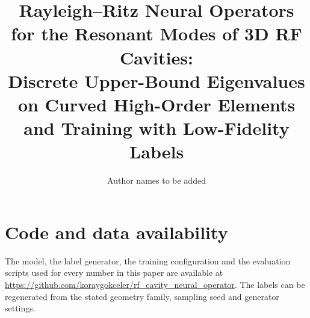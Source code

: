 \documentclass[11pt]{article}
\title{Rayleigh--Ritz Neural Operators for the Resonant Modes of 3D RF Cavities:\\
Discrete Upper-Bound Eigenvalues on Curved High-Order Elements and Training with Low-Fidelity Labels}
\author{Author names to be added}
\date{}
\theoremstyle{definition}
\begin{document}
\maketitle

\begin{abstract}

\end{abstract}










\section*{Code and data availability}
The model, the label generator, the training configuration and the evaluation scripts used for every number in
this paper are available at \url{https://github.com/koraygokceler/rf_cavity_neural_operator}. The labels can be
regenerated from the stated geometry family, sampling seed and generator settings.

\appendix
{}



\end{document}
